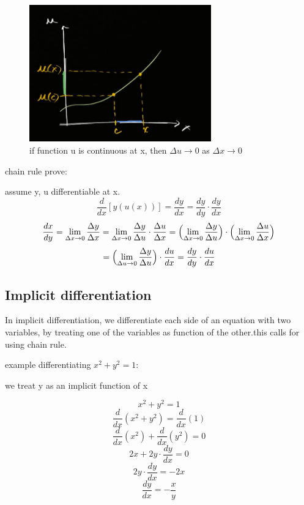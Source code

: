 \documentclass{article}
\begin{document}
        \begin{figure}[ht]
            \centering
            \includegraphics[bb=0 0 303 228, width=0.7\textwidth]{images/change_x_change_u_continuous.png}
            \caption{if function u is continuous at x, then \(\Delta u \to 0\) as \(\Delta x \to 0\)}\label{fig:change_x_change_u_continuous}
        \end{figure}
        chain rule prove: 
        
        assume y, u differentiable at x.
        \[\frac{d}{dx}[y(u(x))] = \frac{dy}{dx} = \frac{dy}{dy} \cdot \frac{dy}{dx}\]
        \[\frac{dx}{dy} = \lim_{\Delta x \to 0} \frac{\Delta y}{ \Delta x} = \lim_{\Delta x \to 0} \frac{\Delta y}{\Delta u} \cdot \frac{\Delta u}{\Delta x} =  \Bigl(\lim_{\Delta x \to 0} \frac{\Delta y}{\Delta u} \Bigr) \cdot \Bigl(\lim_{\Delta x \to 0} \frac{\Delta u}{\Delta x} \Bigr) \]
        \[= \Bigl(\lim_{\Delta u \to 0} \frac{\Delta y}{\Delta u} \Bigr) \cdot \frac{du}{dx} = \frac{dy}{dy} \cdot \frac{du}{dx}\]
        \subsection{Implicit differentiation}
            In implicit differentiation, we differentiate each side of an equation with two variables, by treating one of the variables as function of the other.this calls for using chain rule.

            \noindent example differentiating \(x^2 + y^2 = 1\): 

            \noindent we treat y as an implicit function of x 

            \[x^2 + y^2 = 1\]
            \[\frac{d}{dx}(x^2 + y^2) = \frac{d}{dx}(1)\]
            \[\frac{d}{dx}(x^2) +\frac{d}{dx}(y^2) = 0\]
            \[2x + 2y \cdot \frac{dy}{dx} = 0\]
            \[2y \cdot \frac{dy}{dx} = -2x\]
            \[ \frac{dy}{dx} = -\frac{x}{y}\]
\end{document}
